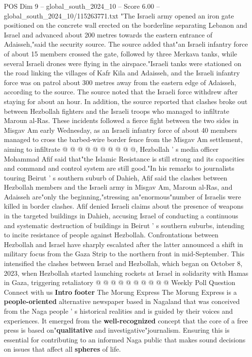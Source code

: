 \begin{textsample}{POS Dim 9 – global\_south\_2024\_10 – Score 6.00 – global\_south\_2024\_10/115263771.txt}  \label{ex:f9_pos_083}
"The Israeli army opened an iron gate positioned on the concrete wall erected on the borderline separating Lebanon and Israel and advanced about 200 metres towards the eastern entrance of Adaisseh,"said the security source.
The source added that"an Israeli infantry force of about 15 members crossed the gate, followed by three Merkava tanks, while several Israeli drones were flying in the airspace."Israeli tanks were stationed on the road linking the villages of Kafr Kila and Adaisseh, and the Israeli infantry force was on patrol about 300 metres away from the eastern edge of Adaisseh, according to the source.
The source noted that the Israeli force withdrew after staying for about an hour.
In addition, the source reported that clashes broke out between Hezbollah fighters and the Israeli troops who managed to infiltrate Maroun al-Ras.
These incidents followed a fierce fight between the two sides in Misgav Am early Wednesday, as an Israeli infantry force of about 40 members managed to cross the barbed-wire border fence from the Misgav Am settlement, aiming to infiltrate @ @ @ @ @ @ @ @ @ @, Hezbollah ' s media officer Mohammad Afif said that"the Islamic Resistance is still strong and its capacities and command and control system are still good."In his remarks to journalists touring Beirut ' s southern suburb of Dahieh, Afif said the clashes between Hezbollah members and the Israeli army in Misgav Am, Maroun al-Ras, and Adaisseh are"only the beginning,"stressing an"enormous"number of Israelis were killed in border clashes.
Afif denied Israeli claims about the presence of weapons in the targeted buildings in Dahieh, accusing Israel of conducting a continuous and systematic destruction of buildings in Beirut ' s southern suburbs, intending to incite resistance of people against Hezbollah.
Confrontations between Hezbollah and Israel have sharply escalated after the latter announced a shift in military focus from the Gaza Strip to the northern front in mid-September.
This intensified the clashes between Israel and Hezbollah, which began on October 8, 2023, when Hezbollah started launching rockets at Israel in solidarity with Hamas in Gaza, triggering retaliatory @ @ @ @ @ @ @ @ @ @ Weekly Poll Question Connect with us \textbf{Intro} \textbf{footer} The Morung Express The Morung Express is a \textbf{people-oriented} alternative newspaper based in Nagaland that was conceived from the Naga people ' s historical realities and is guided by their voices and experiences.
It emerged from the \textbf{well-recognized} concept that the core of a free press is based on"\textbf{qualitative} and investigative"journalism.
Ensuring this is essential for contributing to an informed Naga public that makes sound decisions on issues that affect all \textbf{spheres} of life.

\end{textsample}
